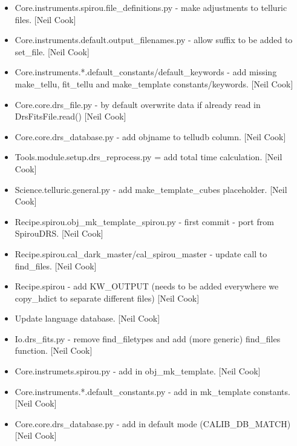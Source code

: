 \documentclass[a4paper,10pt,english]{report}
\begin{document}
\begin{itemize}
\item {} 
Core.instruments.spirou.file\_definitions.py - make adjustments to
telluric files. {[}Neil Cook{]}

\item {} 
Core.instruments.default.output\_filenames.py - allow suffix to be
added to set\_file. {[}Neil Cook{]}

\item {} 
Core.instruments.*.default\_constants/default\_keywords - add missing
make\_tellu, fit\_tellu and make\_template constants/keywords. {[}Neil
Cook{]}

\item {} 
Core.core.drs\_file.py - by default overwrite data if already read in
DrsFitsFile.read() {[}Neil Cook{]}

\item {} 
Core.core.drs\_database.py - add objname to telludb column. {[}Neil Cook{]}

\item {} 
Tools.module.setup.drs\_reprocess.py = add total time calculation.
{[}Neil Cook{]}

\item {} 
Science.telluric.general.py - add make\_template\_cubes placeholder.
{[}Neil Cook{]}

\item {} 
Recipe.spirou.obj\_mk\_template\_spirou.py - first commit - port from
SpirouDRS. {[}Neil Cook{]}

\item {} 
Recipe.spirou.cal\_dark\_master/cal\_spirou\_master - update call to
find\_files. {[}Neil Cook{]}

\item {} 
Recipe.spirou - add KW\_OUTPUT (needs to be added everywhere we
copy\_hdict to separate different files) {[}Neil Cook{]}

\item {} 
Update language database. {[}Neil Cook{]}

\item {} 
Io.drs\_fits.py - remove find\_filetypes and add (more generic)
find\_files function. {[}Neil Cook{]}

\item {} 
Core.instrumets.spirou.py - add in obj\_mk\_template. {[}Neil Cook{]}

\item {} 
Core.instruments.*.default\_constants.py - add in mk\_template
constants. {[}Neil Cook{]}

\item {} 
Core.core.drs\_database.py - add in default mode (CALIB\_DB\_MATCH) {[}Neil
Cook{]}


\end{itemize}
\end{document}
